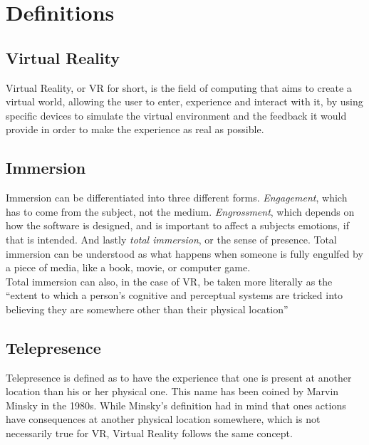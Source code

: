 \documentclass[11pt]{article}
\begin{document}
	\section{Definitions}
		\subsection{Virtual Reality}
			Virtual Reality, or VR for short, is the field of computing that aims to create a virtual world, allowing the user to enter, experience and interact with it, by using specific devices to simulate the virtual environment and the feedback it would provide in order to make the experience as real as possible.
			\cite{boas13}
			
		\subsection{Immersion}
			Immersion can be differentiated into three different forms. \textit{Engagement}, which has to come from the subject, not the medium. \textit{Engrossment}, which depends on how the software is designed, and is important to affect a subjects emotions, if that is intended. And lastly \textit{total immersion}, or the sense of presence. Total immersion can be understood as what happens when someone is fully engulfed by a piece of media, like a book, movie, or computer game. \cite{Brown:2004:GIG:985921.986048} \\
			Total immersion can also, in the case of VR, be taken more literally as the “extent to which a person's cognitive and perceptual systems are tricked into believing they are somewhere other than their physical location” \cite{Patrick:2000:ULP:332040.332479}

		\subsection{Telepresence}
			Telepresence is defined as to have the experience that one is present at another location than his or her physical one.  This name has been coined by Marvin Minsky in the 1980s. \cite{minsky1980telepresence} While Minsky's definition had in mind that ones actions have consequences at another physical location somewhere, which is not necessarily true for VR, Virtual Reality follows the same concept.
			
\end{document}
